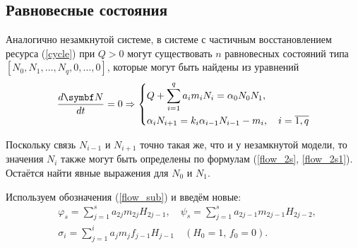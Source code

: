 \subsection{Равновесные состояния}
Аналогично незамкнутой системе, в системе с частичным восстановлением ресурса (\ref{cycle}) при \(Q > 0\) могут существовать \( n \) равновесных состояний типа \(\left[ N_0, N_1, \ldots, N_q, 0, \ldots, 0 \right]\), которые могут быть найдены из уравнений
\begin{equation} \label{cycle_stationary_equations}
    \frac{d \mb{N} }{dt} = 0 \Rightarrow
    \left\lbrace\begin{split}
        & Q + \sum_{i=1}^{q} a_i m_i N_i = \alpha_0 N_0 N_1, \\
        & \alpha_i N_{i+1} = k_i \alpha_{i-1} N_{i-1} - m_i, \quad i=\overline{1,q}                
    \end{split}\right.
\end{equation}

Поскольку связь \(N_{i-1}\) и \(N_{i+1}\) точно такая же, что и у незамкнутой модели, то значения \(N_i\) также могут быть определены по формулам (\ref{flow_2s}, \ref{flow_2s1}). Остаётся найти явные выражения для \(N_0\) и \( N_1\).

Используем обозначения (\ref{flow_sub}) и введём новые:
\begin{equation} \label{cycle_sub}
    \begin{split}
    & \varphi_s = \sum_{j=1}^{s} a_{2j} m_{2j} H_{2j-1}, \quad 
    \psi_s = \sum_{j=1}^{s} a_{2j-1} m_{2j-1} H_{2j-2}, \\
    & \sigma_i = \sum_{j=1}^{i} a_j m_j f_{j-1} H_{j-1} \quad (H_0 = 1, \, f_0 = 0).
    \end{split}
\end{equation}

